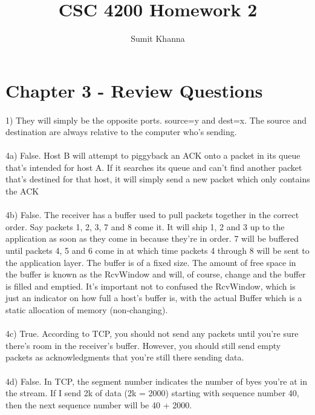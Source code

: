 \documentclass[a4paper,11pt]{article}
\author{Sumit Khanna}
\title{CSC 4200 Homework 2}
\begin{document}
\maketitle
\section{Chapter 3 - Review Questions}
\paragraph{}1) They will simply be the opposite ports. source=y and dest=x. The source and destination are always relative to the computer who's sending.

\paragraph{}4a) False. Host B will attempt to piggyback an ACK onto a packet in its queue that's intended for host A. If it searches its queue and can't find another packet that's destined for that host, it will simply send a new packet which only contains the ACK

\paragraph{}4b) False. The receiver has a buffer used to pull packets together in the correct order. Say packets 1, 2, 3, 7 and 8 come it. It will ship 1, 2 and 3 up to the application as soon as they come in because they're in order. 7 will be buffered until packets 4, 5 and 6 come in at which time packets 4 through 8 will be sent to the application layer. The buffer is of a fixed size. The amount of free space in the buffer is known as the RcvWindow and will, of course, change and the buffer is filled and emptied. It's important not to confused the RcvWindow, which is just an indicator on how full a host's buffer is, with the actual Buffer which is a static allocation of memory (non-changing).

\paragraph{}4c) True. According to TCP, you should not send any packets until you're sure there's room in the receiver's buffer. However, you should still send empty packets as acknowledgments that you're still there sending data.

\paragraph{}4d) False. In TCP, the segment number indicates the number of byes you're at in the stream. If I send 2k of data (2k = 2000) starting with sequence number 40, then the next sequence number will be 40 + 2000. 
\end{document}

